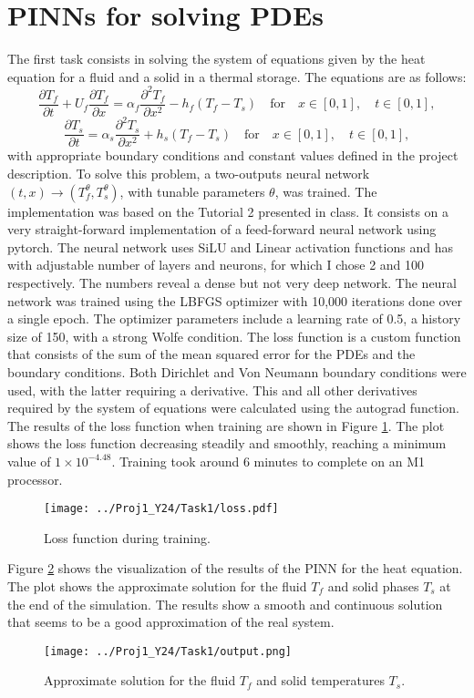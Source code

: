 \documentclass[unicode,11pt,a4paper,oneside,numbers=endperiod,openany]{scrartcl}
\begin{document}
\section{PINNs for solving PDEs}\label{sec:task1}
The first task consists in solving the system of equations given by the heat
equation for a fluid and a solid in a thermal storage. The equations are as follows:
\begin{equation}
    \frac{\partial T_f}{\partial t} + U_f \frac{\partial T_f}{\partial x} = \alpha_f \frac{\partial^2 T_f}{\partial x^2} - h_f(T_f - T_s) \quad \text{for} \quad x \in [0, 1], \quad t \in [0, 1],
\end{equation}
\begin{equation}
     \frac{\partial T_s}{\partial t} = \alpha_s \frac{\partial^2 T_s}{\partial x^2} + h_s(T_f - T_s) \quad \text{for} \quad x \in [0, 1], \quad t \in [0, 1],
\end{equation}
with appropriate boundary conditions and constant values defined in the project description.
To solve this problem, a two-outputs neural network $(t,x) \to
(T^{\theta}_f,T^{\theta}_s)$, with tunable parameters $\theta$, was trained.
The implementation was based on the Tutorial 2 presented in class. It consists on a
very straight-forward implementation of a feed-forward neural network using
pytorch. 
The neural network uses SiLU and Linear activation functions and has with adjustable
number of layers and neurons, for which I chose 2 and 100 respectively. The numbers
reveal a dense but not very deep network.
The neural network was trained using the LBFGS optimizer with 10,000
iterations done over a single epoch. The optimizer parameters include a learning rate 
of 0.5, a history size of 150, with a strong Wolfe condition. The loss
function is a custom function that consists of the sum of the mean squared
error for the PDEs and the boundary conditions. 
Both Dirichlet and Von Neumann boundary conditions were used, with the latter
requiring a derivative. This and all other derivatives required by the system of
equations were calculated using the autograd function.
The results of the loss function when training are shown in Figure
\ref{fig:task1_loss}. The plot shows the loss function decreasing steadily and
smoothly, reaching a minimum value of $1\times 10^{-4.48}$. Training took around 6
minutes to complete on an M1 processor.
\begin{figure}[h]
    \centering
    \texttt{[image: ../Proj1\_Y24/Task1/loss.pdf]}
    \caption{Loss function during training.}
    \label{fig:task1_loss}
\end{figure}
Figure \ref{fig:task1} shows the visualization of the results of the PINN for
the heat equation. The plot shows the approximate solution for the fluid $T_f$
and solid phases $T_s$ at the end of the simulation. The results show a smooth
and continuous solution that seems to be a good approximation of the real system.
\begin{figure}[h]
    \centering
    \texttt{[image: ../Proj1\_Y24/Task1/output.png]}
    \caption{Approximate solution for the fluid $T_f$ and solid temperatures $T_s$.}
    \label{fig:task1}
\end{figure}
\end{document}
